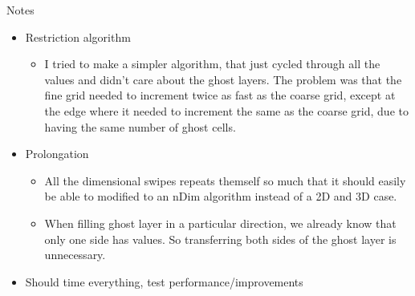 	Notes
	\begin{itemize}
		\item Restriction algorithm
			\begin{itemize}
				\item I tried to make a simpler algorithm, that just cycled through all the values and didn't care about the ghost layers.
						The problem was that the fine grid needed to increment twice as fast as the coarse grid, except at the edge where
						it needed to increment the same as the coarse grid, due to having the same number of ghost cells.
			\end{itemize}
		\item Prolongation
			\begin{itemize}
				\item All the dimensional swipes repeats themself so much that it should easily be able to
					modified to an nDim algorithm instead of a 2D and 3D case.
				\item When filling ghost layer in a particular direction, we already know that only one side has values. So transferring both sides
 					of the ghost layer is unnecessary.
			\end{itemize}
		\item Should time everything, test performance/improvements
	\end{itemize}
